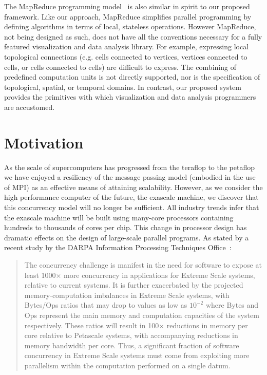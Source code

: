 \documentclass{vgtc}                          %
\newcommand*{\lcite}[1]{~\cite{#1}}
\begin{document}
The MapReduce programming model\lcite{MapReduce} is also similar in spirit
to our proposed framework.  Like our approach, MapReduce simplifies
parallel programming by defining algorithms in terms of local, stateless
operations.  However MapReduce, not being designed as such, does not have
all the conventions necessary for a fully featured visualization and data
analysis library.  For example, expressing local topological connections
(e.g. cells connected to vertices, vertices connected to cells, or cells
connected to cells) are difficult to express.  The combining of predefined
computation units is not directly supported, nor is the specification of
topological, spatial, or temporal domains.  In contrast, our proposed
system provides the primitives with which visualization and data analysis
programmers are accustomed.

\section{Motivation}
\label{sec:Motivation}


As the scale of supercomputers has progressed from the teraflop to the
petaflop we have enjoyed a resiliency of the message passing model
(embodied in the use of MPI) as an effective means of attaining
scalability.  However, as we consider the high performance computer of the
future, the exascale machine, we discover that this concurrency model will
no longer be sufficient.  All industry trends infer that the exascale
machine will be built using many-core processors containing hundreds to
thousands of cores per chip.  This change in processor design has dramatic
effects on the design of large-scale parallel programs.  As stated by a
recent study by the DARPA Information Processing Techniques
Office\lcite{DARPAExascaleStudy}:

\begin{quote}
  The concurrency challenge is manifest in the need for software to expose
  at least 1000$\times$ more concurrency in applications for Extreme Scale
  systems, relative to current systems. It is further exacerbated by the
  projected memory-computation imbalances in Extreme Scale systems, with
  Bytes/Ops ratios that may drop to values as low as $10^{-2}$ where Bytes
  and Ops represent the main memory and computation capacities of the
  system respectively. These ratios will result in 100$\times$ reductions
  in memory per core relative to Petascale systems, with accompanying
  reductions in memory bandwidth per core.  Thus, a significant fraction of
  software concurrency in Extreme Scale systems must come from exploiting
  more parallelism within the computation performed on a single datum.
\end{quote}
\end{document}
